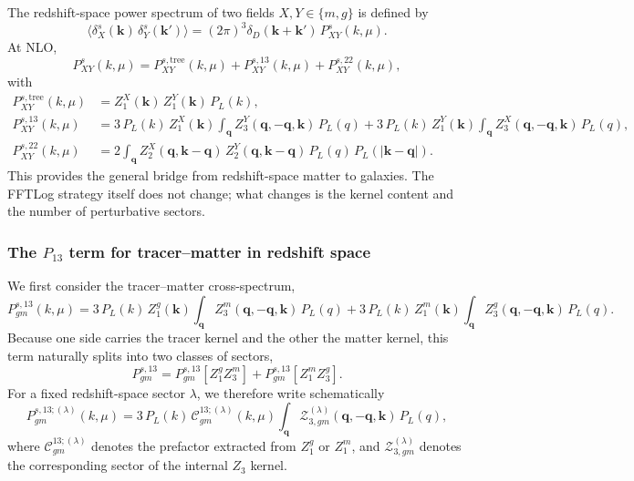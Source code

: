 \documentclass[a4paper,11pt]{article}
\newcommand{\vk}{\bm{k}}
\newcommand{\vq}{\bm{q}}
\newcommand{\<}{\langle}
\renewcommand{\>}{\rangle}
\begin{document}
The redshift-space power spectrum of two fields \(X,Y\in\{m,g\}\) is defined by
\begin{equation}
\langle \delta_X^s(\vk)\,\delta_Y^s(\vk')\rangle
=
(2\pi)^3\delta_D(\vk+\vk')\,P_{XY}^s(k,\mu).
\end{equation}
At NLO,
\begin{equation}
P_{XY}^s(k,\mu)
=
P_{XY}^{s,\mathrm{tree}}(k,\mu)
+
P_{XY}^{s,13}(k,\mu)
+
P_{XY}^{s,22}(k,\mu),
\label{eq:PXYs_NLO}
\end{equation}
with
\begin{align}
P_{XY}^{s,\mathrm{tree}}(k,\mu)
&=
Z_1^X(\vk)\,Z_1^Y(\vk)\,P_L(k),
\label{eq:PXY_tree_general}
\\
P_{XY}^{s,13}(k,\mu)
&=
3\,P_L(k)\,Z_1^X(\vk)
\int_{\vq} Z_3^Y(\vq,-\vq,\vk)\,P_L(q)
+
3\,P_L(k)\,Z_1^Y(\vk)
\int_{\vq} Z_3^X(\vq,-\vq,\vk)\,P_L(q),
\label{eq:PXY_13_general}
\\
P_{XY}^{s,22}(k,\mu)
&=
2\int_{\vq}
Z_2^X(\vq,\vk-\vq)\,
Z_2^Y(\vq,\vk-\vq)\,
P_L(q)\,P_L(|\vk-\vq|).
\label{eq:PXY_22_general}
\end{align}
This provides the general bridge from redshift-space matter to galaxies. The FFTLog strategy itself does not change; what changes is the kernel content and the number of perturbative sectors.

\subsubsection{The \(P_{13}\) term for tracer--matter in redshift space}

We first consider the tracer--matter cross-spectrum,
\begin{equation}
P_{gm}^{s,13}(k,\mu)
=
3\,P_L(k)\,Z_1^g(\vk)
\int_{\vq} Z_3^m(\vq,-\vq,\vk)\,P_L(q)
+
3\,P_L(k)\,Z_1^m(\vk)
\int_{\vq} Z_3^g(\vq,-\vq,\vk)\,P_L(q).
\label{eq:P13_gm_start}
\end{equation}
Because one side carries the tracer kernel and the other the matter kernel, this term naturally splits into two classes of sectors,
\begin{equation}
P_{gm}^{s,13}
=
P_{gm}^{s,13}[Z_1^g Z_3^m]
+
P_{gm}^{s,13}[Z_1^m Z_3^g].
\end{equation}
For a fixed redshift-space sector \(\lambda\), we therefore write schematically
\begin{equation}
P_{gm}^{s,13;(\lambda)}(k,\mu)
=
3\,P_L(k)\,\mathcal C_{gm}^{13;(\lambda)}(k,\mu)
\int_{\vq}\mathcal Z_{3,gm}^{(\lambda)}(\vq,-\vq,\vk)\,P_L(q),
\label{eq:P13_gm_lambda_start}
\end{equation}
where \(\mathcal C_{gm}^{13;(\lambda)}\) denotes the prefactor extracted from \(Z_1^g\) or \(Z_1^m\), and \(\mathcal Z_{3,gm}^{(\lambda)}\) denotes the corresponding sector of the internal \(Z_3\) kernel.
\end{document}
